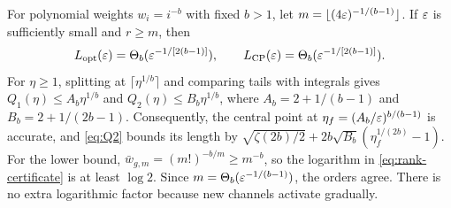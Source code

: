 For polynomial weights $w_i=i^{-b}$ with fixed $b>1$, let
$m=\lfloor(4\varepsilon)^{-1/(b-1)}\rfloor$. If $\varepsilon$ is sufficiently small
and $r\geq m$, then
\begin{equation}
 L_{\mathrm{opt}}(\varepsilon)=\Theta_b(\varepsilon^{-1/[2(b-1)]}),\qquad
 L_{\mathrm{CP}}(\varepsilon)=\Theta_b(\varepsilon^{-1/[2(b-1)]}).
 \label{eq:polynomial-decay}
\end{equation}
For $\eta\geq1$, splitting at $\lceil\eta^{1/b}\rceil$ and comparing
tails with integrals gives
$Q_1(\eta)\leq A_b\eta^{1/b}$ and
$Q_2(\eta)\leq B_b\eta^{1/b}$, where
$A_b=2+1/(b-1)$ and $B_b=2+1/(2b-1)$.
Consequently, the central point at $\eta_f=(A_b/\varepsilon)^{b/(b-1)}$ is
accurate, and
\eqref{eq:Q2} bounds its length by
$\sqrt{\zeta(2b)/2}+2b\sqrt{B_b}(\eta_f^{1/(2b)}-1)$.
For the lower bound, $\bar w_{g,m}=(m!)^{-b/m}\geq m^{-b}$, so the
logarithm in \eqref{eq:rank-certificate} is at least $\log2$.
Since $m=\Theta_b(\varepsilon^{-1/(b-1)})$, the orders agree. There is no extra
logarithmic factor because new channels activate gradually.
